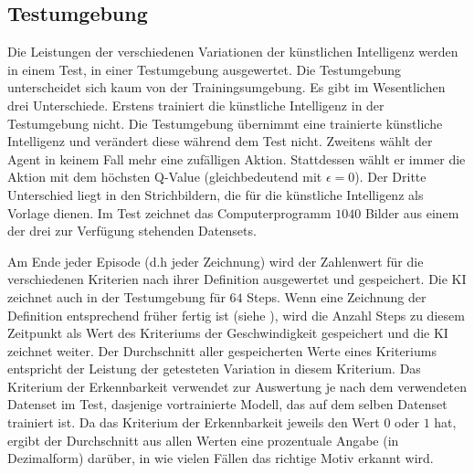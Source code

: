 
\subsection{Testumgebung}
\label{sub:m_auswert_test}

Die Leistungen der verschiedenen Variationen der künstlichen Intelligenz werden
in einem Test, in einer Testumgebung ausgewertet. Die Testumgebung unterscheidet
sich kaum von der Trainingsumgebung. Es gibt im Wesentlichen drei Unterschiede.
Erstens trainiert die künstliche Intelligenz in der Testumgebung nicht. Die
Testumgebung übernimmt eine trainierte künstliche Intelligenz und verändert
diese während dem Test nicht. Zweitens wählt der Agent in keinem Fall mehr eine
zufälligen Aktion. Stattdessen wählt er immer die Aktion mit dem höchsten
Q-Value (gleichbedeutend mit $\epsilon = 0$). Der Dritte Unterschied liegt in
den Strichbildern, die für die künstliche Intelligenz als Vorlage dienen. Im
Test zeichnet das Computerprogramm $1040$ Bilder aus einem der drei zur
Verfügung stehenden Datensets. 

Am Ende jeder Episode (d.h jeder Zeichnung) wird der Zahlenwert für die
verschiedenen Kriterien nach ihrer Definition ausgewertet und gespeichert. Die
KI zeichnet auch in der Testumgebung für $64$ Steps. Wenn eine Zeichnung der
Definition entsprechend früher fertig ist (siehe ),
wird die Anzahl Steps zu diesem Zeitpunkt als Wert des Kriteriums der
Geschwindigkeit gespeichert und die KI zeichnet weiter. Der Durchschnitt aller
gespeicherten Werte eines Kriteriums entspricht der Leistung der getesteten
Variation in diesem Kriterium. Das Kriterium der Erkennbarkeit verwendet zur
Auswertung je nach dem verwendeten Datenset im Test, dasjenige vortrainierte
Modell, das auf dem selben Datenset trainiert ist. Da das Kriterium der
Erkennbarkeit jeweils den Wert $0$ oder $1$ hat, ergibt der Durchschnitt aus
allen Werten eine prozentuale Angabe (in Dezimalform) darüber, in wie vielen
Fällen das richtige Motiv erkannt wird.



